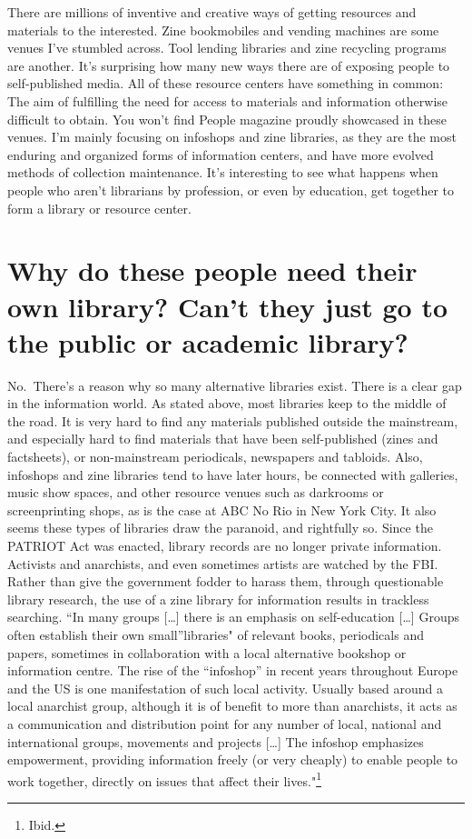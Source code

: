 \documentclass[output=paper]{langscibook}
\begin{document}
There are millions of inventive and creative ways of getting resources
and materials to the interested. Zine bookmobiles and vending machines
are some venues I've stumbled across. Tool lending libraries and zine
recycling programs are another. It's surprising how many new ways there
are of exposing people to self-published media. All of these resource
centers have something in common: The aim of fulfilling the need for
access to materials and information otherwise difficult to obtain. You
won't find People magazine proudly showcased in these venues. I'm mainly
focusing on infoshops and zine libraries, as they are the most enduring
and organized forms of information centers, and have more evolved
methods of collection maintenance. It's interesting to see what happens
when people who aren't librarians by profession, or even by education,
get together to form a library or resource center.

\hypertarget{why-do-these-people-need-their-own-library-cant-they-just-go-to-the-public-or-academic-library}{%
\section{Why do these people need their own library? Can't they just go
to the public or academic
library?}\label{why-do-these-people-need-their-own-library-cant-they-just-go-to-the-public-or-academic-library}}

No.~There's a reason why so many alternative libraries exist. There is a
clear gap in the information world. As stated above, most libraries keep
to the middle of the road. It is very hard to find any materials
published outside the mainstream, and especially hard to find materials
that have been self-published (zines and factsheets), or non-mainstream
periodicals, newspapers and tabloids. Also, infoshops and zine libraries
tend to have later hours, be connected with galleries, music show
spaces, and other resource venues such as darkrooms or screenprinting
shops, as is the case at ABC No Rio in New York City. It also seems
these types of libraries draw the paranoid, and rightfully so. Since the
PATRIOT Act was enacted, library records are no longer private
information. Activists and anarchists, and even sometimes artists are
watched by the FBI. Rather than give the government fodder to harass
them, through questionable library research, the use of a zine library
for information results in trackless searching. \enquote{In many groups
{[}\ldots{]} there is an emphasis on self-education {[}\ldots{]} Groups
often establish their own small}libraries" of relevant books,
periodicals and papers, sometimes in collaboration with a local
alternative bookshop or information centre. The rise of the
\enquote{infoshop} in recent years throughout Europe and the US is one
manifestation of such local activity. Usually based around a local
anarchist group, although it is of benefit to more than anarchists, it
acts as a communication and distribution point for any number of local,
national and international groups, movements and projects {[}\ldots{]}
The infoshop emphasizes empowerment, providing information freely (or
very cheaply) to enable people to work together, directly on issues that
affect their lives."\footnote{Ibid.}
\end{document}

